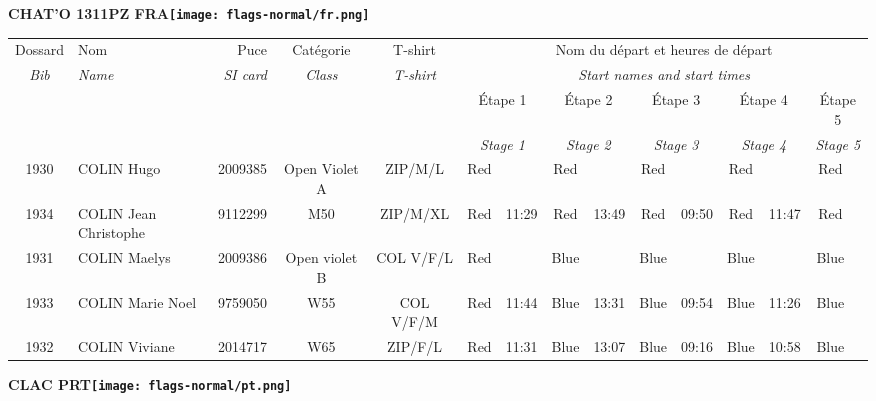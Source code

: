 \documentclass{report}
\begin{document}
\newpage
  \Huge \centering \bfseries CHAT'O 1311PZ FRA\normalfont \footnotesize \sffamily \hfill \texttt{[image: flags-normal/fr.png]} \newline 
  \begin{longtable}{|c|l|r|c|c|*{5}{cc|}}
    Dossard & Nom  & Puce    & Catégorie & T-shirt & \multicolumn{10}{c|}{Nom du départ et heures de départ} \\
    \itshape Bib     & \itshape Name & \itshape SI card & \itshape Class  & \itshape  T-shirt  & \multicolumn{10}{c|}{\itshape Start names and start times} \\
    \hline
    & & & & & \multicolumn{2}{c|}{Étape 1} & \multicolumn{2}{c|}{Étape 2} & \multicolumn{2}{c|}{Étape 3} & \multicolumn{2}{c|}{Étape 4} & \multicolumn{2}{c|}{Étape 5} \\
    & & & & & \multicolumn{2}{c|}{\itshape Stage 1} & \multicolumn{2}{c|}{\itshape Stage 2} & \multicolumn{2}{c|}{\itshape Stage 3} & \multicolumn{2}{c|}{\itshape Stage 4} & \multicolumn{2}{c|}{\itshape Stage 5} \\
    \hline
    1930 & COLIN Hugo & 2009385 & Open Violet A & ZIP/M/L & Red &   & Red &   & Red &   & Red &   & Red &  \\
    1934 & COLIN Jean Christophe & 9112299 & M50 & ZIP/M/XL & Red & 11:29 & Red & 13:49 & Red & 09:50 & Red & 11:47 & Red &  \\
    1931 & COLIN Maelys & 2009386 & Open violet B & COL V/F/L & Red &   & Blue &   & Blue &   & Blue &   & Blue &  \\
    1933 & COLIN Marie Noel & 9759050 & W55 & COL V/F/M & Red & 11:44 & Blue & 13:31 & Blue & 09:54 & Blue & 11:26 & Blue &  \\
    1932 & COLIN Viviane & 2014717 & W65 & ZIP/F/L & Red & 11:31 & Blue & 13:07 & Blue & 09:16 & Blue & 10:58 & Blue &  \\
  \end{longtable}
\newpage
  \Huge \centering \bfseries CLAC  PRT\normalfont \footnotesize \sffamily \hfill \texttt{[image: flags-normal/pt.png]} \newline 
\end{document}
